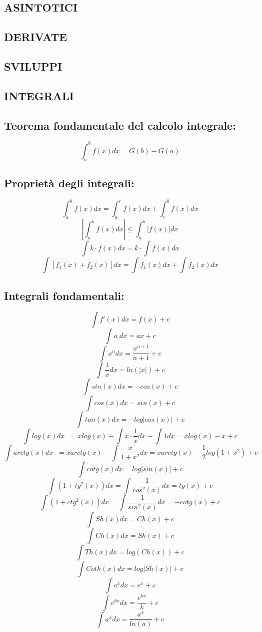 \documentclass[a4paper, 9pt]{report}
\begin{document}
\subsection*{ASINTOTICI}
\subsection*{DERIVATE}
\subsection*{SVILUPPI}
\subsection*{INTEGRALI}
\subsection*{Teorema fondamentale del calcolo integrale:}
\[
    \int_{a}^{b} f(x) dx = G(b) - G(a)
\]
\subsection*{Proprietà degli integrali:}
\[
    \int_{a}^{b} f(x)dx = \int_{a}^{r} f(x) dx + \int_{r}^{b} f(x) dx
\]
\[
    \left| \int_{a}^{b} f(x) dx \right| \leq \int_{a}^{b} |f(x)| dx
\]
\[
    \int k \cdot f(x) dx = k \cdot \int f(x) dx
\]
\[
    \int [f_1(x) + f_2(x) ] dx= \int f_1(x) dx + \int f_2(x) dx
\]
\subsection*{Integrali fondamentali:}
\[
    \int f'(x) dx = f(x) +c
\]
\[
    \int a \; dx = ax +c
\]
\[
    \int x^n dx = \frac{x^{n+1}}{n+1} +c
\]
\[
    \int \frac{1}{x}dx = ln(|x|) +c
\]
\[
    \int sin(x) dx = -cos(x) +c
\]
\[
    \int cos(x) dx = sin(x)+c
\]
\[
    \int tan(x) dx = -log|cos(x)| +c
\]
\[
    \int log(x) dx \;\; = xlog(x) - \int x \cdot  \frac{1}{x} dx - \int 1 dx = x log(x) -x + c
\]
\[
    \int arctg (x) dx \;\; = x arctg(x) -\int \frac{x}{1+x^2}dx = x arctg(x) -\frac{1}{2}log(1+x^2) + c 
\]
\[
    \int cotg(x) dx = log|sin(x)| +c
\]
\[
    \int (1+tg^2(x))dx = \int \frac{1}{cos^2(x)} dx = tg(x) +c
\]
\[
    \int (1+ctg^2(x))dx = \int \frac{1}{sin^2(x)} dx = -cotg(x) +c
\]
\[
    \int Sh(x) dx = Ch(x) +c
\]
\[
    \int Ch(x) dx = Sh(x) +c
\]
\[
    \int Th(x) dx = log(Ch(x))+c
\]
\[
    \int Coth(x) dx = log|Sh(x)| +c
\]
\[
    \int e^x dx = e^x+c
\]
\[
    \int e^{kx} dx = \frac{e^{kx}}{k} +c
\]
\[
    \int a^x dx = \frac{a^x}{ln(a)}+c
\]
\end{document}
